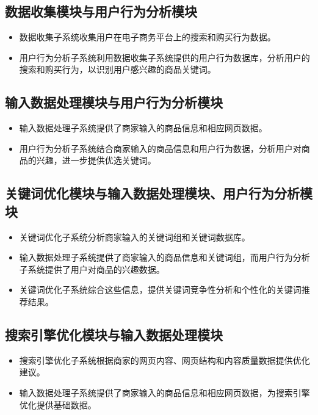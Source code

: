 \documentclass[11pt, a4paper, oneside]{ctexbook}
\begin{document}
\subsection{数据收集模块与用户行为分析模块}
\begin{itemize}
    \item 数据收集子系统收集用户在电子商务平台上的搜索和购买行为数据。
    \item 用户行为分析子系统利用数据收集子系统提供的用户行为数据库，分析用户的搜索和购买行为，以识别用户感兴趣的商品关键词。
\end{itemize}

\subsection{输入数据处理模块与用户行为分析模块}
\begin{itemize}
    \item 输入数据处理子系统提供了商家输入的商品信息和相应网页数据。
    \item 用户行为分析子系统结合商家输入的商品信息和用户行为数据，分析用户对商品的兴趣，进一步提供优选关键词。
\end{itemize}

\subsection{关键词优化模块与输入数据处理模块、用户行为分析模块}
\begin{itemize}
    \item 关键词优化子系统分析商家输入的关键词组和关键词数据库。
    \item 输入数据处理子系统提供了商家输入的商品信息和关键词组，而用户行为分析子系统提供了用户对商品的兴趣数据。
    \item 关键词优化子系统综合这些信息，提供关键词竞争性分析和个性化的关键词推荐结果。
\end{itemize}

\subsection{搜索引擎优化模块与输入数据处理模块}
\begin{itemize}
    \item 搜索引擎优化子系统根据商家的网页内容、网页结构和内容质量数据提供优化建议。
    \item 输入数据处理子系统提供了商家输入的商品信息和相应网页数据，为搜索引擎优化提供基础数据。
\end{itemize}
\end{document}
